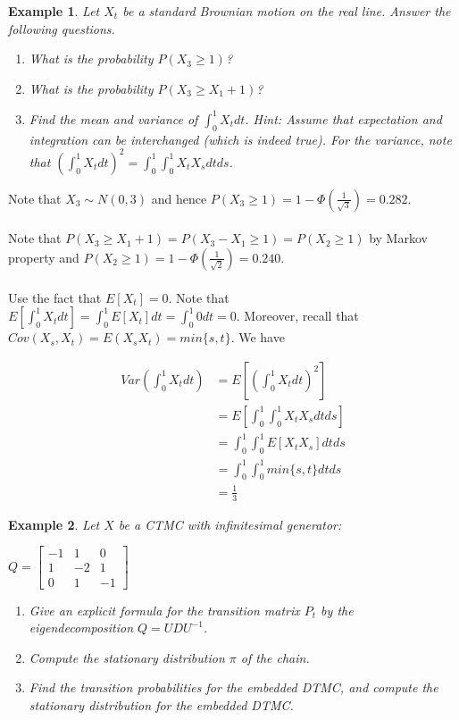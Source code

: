 \documentclass[12pt]{article}
\newtheorem{example}{Example}
\begin{document}
\begin{example}
    Let $X_t$ be a standard Brownian motion on the real line. Answer the following questions.
    \begin{enumerate}
        \item What is the probability $P(X_3 \geq 1)$?
        \item What is the probability $P(X_3 \geq X_1 + 1)$?
        \item Find the mean and variance of $\int_{0}^{1} X_t dt$. Hint: Assume that expectation and integration can be interchanged (which is indeed true). For the variance, note that $(\int_{0}^{1} X_t dt)^2 = \int_{0}^{1} \int_{0}^{1} X_t X_s dt ds$.
    \end{enumerate}
\end{example}

\noindent Note that $X_3 \sim N(0,3)$ and hence $P(X_3 \geq 1) = 1 - \Phi(\frac{1}{\sqrt{3}}) = 0.282$.
\\
\\Note that $P(X_3 \geq X_1 + 1) = P(X_3 - X_1 \geq 1) = P(X_2 \geq 1)$ by Markov property and $P(X_2 \geq 1) = 1 - \Phi(\frac{1}{\sqrt{2}}) = 0.240$.
\\
\\Use the fact that $E[X_t] = 0$. Note that $E\left [ \int_{0}^{1} X_t dt \right ] = \int_{0}^{1} E[X_t]dt=\int_{0}^{1}0dt=0$. Moreover, recall that $Cov(X_s,X_t) = E(X_sX_t)=min\{s,t\}$. We have
\begin{center}
    \begin{align*}
        Var\left ( \int_{0}^{1} X_tdt  \right ) & = E\left [ \left ( \int_{0}^{1} X_t dt \right ) ^ 2\right] \\
        & = E \left[ \int_{0}^{1} \int_{0}^{1} X_t X_s dt ds \right] \\
        & = \int_{0}^{1} \int_{0}^{1} E[X_tX_s] dt ds \\
        & = \int_{0}^{1} \int_{0}^{1} min\{s,t\} dt ds \\
        & = \frac{1}{3}
    \end{align*}
\end{center}

\begin{example}
    Let $X$ be a CTMC with infinitesimal generator:
    \begin{center}
        $Q = \begin{bmatrix}
         -1 & 1 & 0\\
         1 & -2 & 1\\
         0 & 1 & -1
        \end{bmatrix}$
    \end{center}
    \begin{enumerate}
        \item Give an explicit formula for the transition matrix $P_t$ by the eigendecomposition $Q = UDU^{-1}$.
        \item Compute the stationary distribution $\pi$ of the chain.
        \item Find the transition probabilities for the embedded DTMC, and compute the stationary distribution for the embedded DTMC.
    \end{enumerate}
\end{example}
\end{document}
